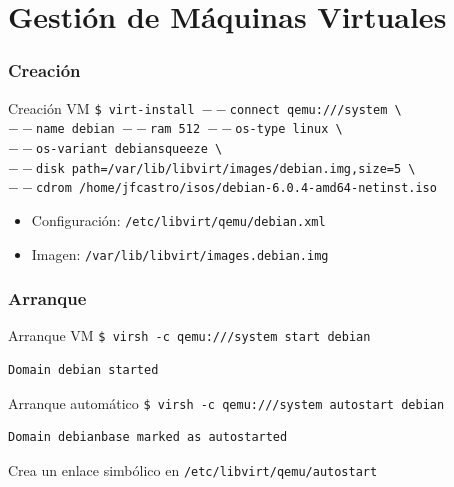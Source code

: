 \documentclass{beamer}
\begin{document}
\section{Gestión de Máquinas Virtuales}

\begin{frame}
  \frametitle{Creación}
  \begin{block}{Creación VM}
    \scriptsize{\texttt{\$ virt-install $--$connect qemu:///system \textbackslash \\
    $--$name debian $--$ram 512 $--$os-type linux \textbackslash \\
    $--$os-variant debiansqueeze \textbackslash \\
    $--$disk path=/var/lib/libvirt/images/debian.img,size=5 \textbackslash \\
    $--$cdrom /home/jfcastro/isos/debian-6.0.4-amd64-netinst.iso}}
  \end{block}
  \begin{itemize}
    \item Configuración: \texttt{/etc/libvirt/qemu/debian.xml}
    \item Imagen: \texttt{/var/lib/libvirt/images.debian.img}
  \end{itemize}
\end{frame}

\begin{frame}[fragile]
  \frametitle{Arranque}
  \begin{block}{Arranque VM}
    \texttt{\$ virsh -c qemu:///system start debian} \\
    \small{\begin{verbatim}
Domain debian started
    \end{verbatim}}
  \end{block}
  \bigskip
  \begin{block}{Arranque automático}
    \texttt{\$ virsh -c qemu:///system autostart debian} \\
    \small{\begin{verbatim}
Domain debianbase marked as autostarted
    \end{verbatim}}
  \end{block}
  Crea un enlace simbólico en \texttt{/etc/libvirt/qemu/autostart}
\end{frame}
\end{document}
